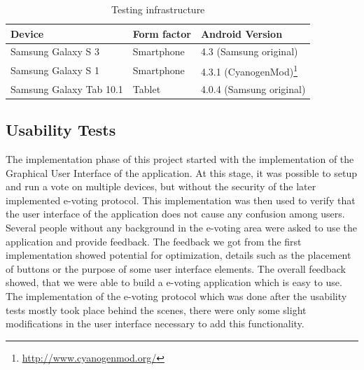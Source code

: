 \documentclass[numbers=noenddot, abstract=on, a4paper, headsepline,
footsepline, oneside, openright, draft=off, listof=leveldown]{scrreprt}
\begin{document}
\begin{table}[htbp]
	\centering
	\renewcommand{\arraystretch}{1.4}
	\begin{minipage}{\linewidth}
	\begin{tabularx}{\textwidth}{lll}
		\toprule
		\textbf{Device}	&  \textbf{Form factor} & \textbf{Android Version} 	\\
		\midrule
		Samsung Galaxy S 3		& Smartphone	& 4.3 (Samsung original)	\\
		Samsung Galaxy S 1  	& Smartphone	& 4.3.1
		(CyanogenMod)\footnote{\url{http://www.cyanogenmod.org/}}		\\
		Samsung Galaxy Tab 10.1	& Tablet		& 4.0.4 (Samsung original)	\\
		\bottomrule
	\end{tabularx}
	\end{minipage}
	\renewcommand{\arraystretch}{1}
	\caption{Testing infrastructure}
	\label{tab:testinginfrastructure}
\end{table}

\subsection{Usability Tests}
\label{sec:usabilitytests}
The implementation phase of this project started with the implementation of the
Graphical User Interface of the application. At this stage, it was possible to
setup and run a vote on multiple devices, but without the security of the later
implemented e-voting protocol. This implementation was then used to verify that
the user interface of the application does not cause any confusion among users.
Several people without any background in the e-voting area were asked to use the
application and provide feedback. The feedback we got from the first
implementation showed potential for optimization, details such as the placement
of buttons or the purpose of some user interface elements. The overall feedback
showed, that we were able to build a e-voting application which is easy to use.
The implementation of the e-voting protocol which was done after the
usability tests mostly took place behind the scenes, there were only some
slight modifications in the user interface necessary to add this functionality.
\end{document}
